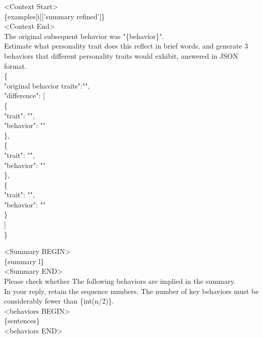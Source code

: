 \begin{tcolorbox}[title = {Distracter Generation}, breakable]
<Context Start>\\
\{examples[i]['summary refined']\}\\
<Context End>\\

The original subsequent behavior was "\{behavior\}".\\
Estimate what personality trait does this reflect in brief words, and generate 3 behaviors that different personality traits would exhibit, answered in JSON format.\\
\{\\
"original behavior traits":"",\\
"difference": [\\
\{\\
 "trait": "",\\
 "behavior": ""\\
 \},\\
\{\\
 "trait": "",\\
"behavior": ""\\
 \},\\
\{\\
 "trait": "",\\
 "behavior": ""\\
 \}\\
]\\
\}

\end{tcolorbox}




\begin{tcolorbox}[title = {Level Define}, breakable]
<Summary BEGIN>\\
\{summary l\}\\
<Summary END>\\
Please check whether The following behaviors are implied in the summary.\\
In your reply, retain the sequence numbers. The number of key behaviors must be considerably fewer than \{int(n/2)\}.\\

<behaviors BEGIN>\\
\{sentences\}\\
<behaviors END>

\end{tcolorbox}





